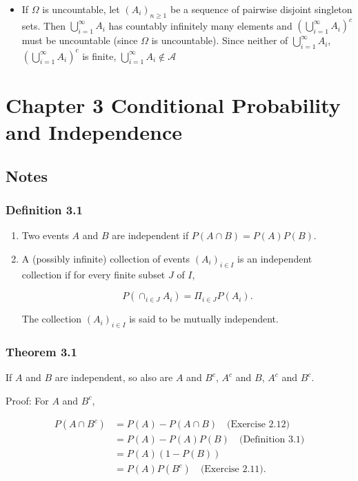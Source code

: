 \documentclass{article}
\begin{document}
\begin{enumerate}
\begin{itemize}
\item If $\Omega$ is uncountable, let $(A_i)_{n\geq 1}$ be a sequence of pairwise disjoint singleton sets. Then $\bigcup_{i=1}^\infty A_i$ has countably infinitely many elements and $\left(\bigcup_{i=1}^\infty A_i\right)^c$ must be uncountable (since $\Omega$ is uncountable). Since neither of $\bigcup_{i=1}^\infty A_i$, $\left(\bigcup_{i=1}^\infty A_i\right)^c$ is finite, $\bigcup_{i=1}^\infty A_i \notin \mathcal{A}$
\end{itemize}

\end{enumerate}

\newpage 
\section*{Chapter 3 Conditional Probability and Independence}

\subsection*{Notes}

\subsubsection*{Definition 3.1} 
\begin{enumerate}
\item Two events $A$ and $B$ are independent if $P(A\cap B) = P(A)P(B)$. 

\item A (possibly infinite) collection of events $(A_i)_{i\in I}$ is an independent collection if for every finite subset $J$ of $I$,

$$
P\left(\cap_{i \in J} A_i \right) = \Pi_{i \in J} P(A_i).
$$

The collection $(A_i)_{i \in I}$ is said to be mutually independent. 
\end{enumerate}

\subsubsection*{Theorem 3.1} If $A$ and $B$ are independent, so also are $A$ and $B^c$, $A^c$ and $B$, $A^c$ and $B^c$. 

Proof: For $A$ and $B^c$,

\begin{align*}
P(A \cap B^c) &= P(A) - P(A\cap B) \quad \text{(Exercise 2.12)} \\
&= P(A) - P(A)P(B) \quad \text{(Definition 3.1)} \\
&= P(A)(1-P(B)) \\
&= P(A)P(B^c) \quad \text{(Exercise 2.11)}.
\end{align*}
\end{document}
